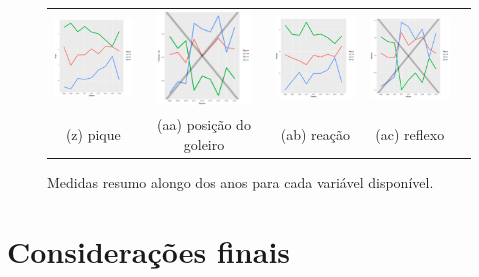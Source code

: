 \documentclass[doc,apacite,oneside,a4paper,12pt]{apa6}
\begin{document}
\begin{figure}
\begin{tabular}{ccccc}
    \includegraphics[width=25mm]{pique_result}  & \includegraphics[width=25mm]{posicion_gl_result} &   \includegraphics[width=25mm]{reacao_result}&
  \includegraphics[width=25mm]{reflexos_result}    &    \\
 \scriptsize{(z) pique} & \scriptsize{(aa) posição do goleiro} & \scriptsize{(ab) reação} & \scriptsize{(ac) reflexo} & \\[3pt]

\end{tabular}
    \caption[\scriptsize{Medidas resumo.}]{\scriptsize{Medidas resumo alongo dos anos para cada variável disponível.}}
\end{figure}




 
\section{Considerações finais}
\label{sec:conclu}
\noindent



\end{document}
